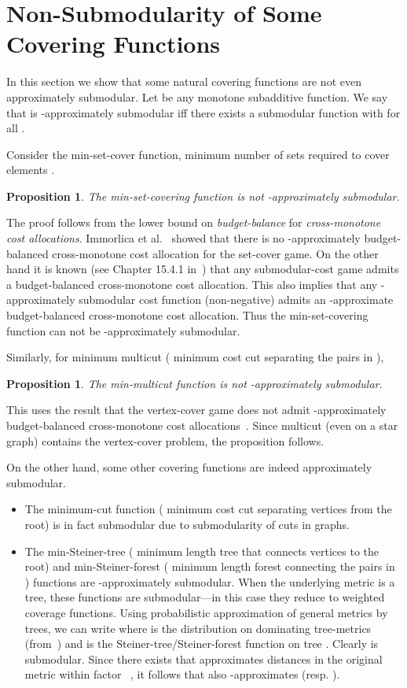 \documentclass[11pt,letterpaper]{article}
\newtheorem{proposition}[theorem]{Proposition}
\newenvironment{proof}{

\noindent{\bf Proof:}} {\hfill


}
\begin{document}
\section{Non-Submodularity of Some Covering Functions}
\label{sec:lbd} In this section we show that some natural covering functions are not even approximately submodular. Let
 be any monotone subadditive function. We say that  is -approximately
submodular iff there exists a submodular function  with  for all .


Consider the min-set-cover function,  minimum number of sets required to cover elements .
\begin{proposition}
The min-set-covering function is not -approximately submodular.
\end{proposition}
\begin{proof}
The proof follows from the lower bound on {\em budget-balance} for {\em cross-monotone cost allocations}. Immorlica et
al.~\cite{IMM08} showed that there is no -approximately budget-balanced cross-monotone cost allocation for the
set-cover game. On the other hand it is known (see Chapter 15.4.1 in~\cite{AlgGameThy-book}) that any submodular-cost
game admits a budget-balanced cross-monotone cost allocation. This also implies that any -approximately
submodular cost function (non-negative) admits an -approximate budget-balanced cross-monotone cost allocation.
Thus the min-set-covering function can not be -approximately submodular.
\end{proof}

Similarly, for minimum multicut ( minimum cost cut separating the pairs in ),
\begin{proposition}
The min-multicut function is not -approximately submodular.
\end{proposition}
\begin{proof}
This uses the result that the vertex-cover game does not admit -approximately budget-balanced
cross-monotone cost allocations~\cite{IMM08}. Since multicut (even on a star graph) contains the vertex-cover problem,
the proposition follows.
\end{proof}

On the other hand, some other covering functions are indeed approximately submodular.
\begin{itemize}
\item The minimum-cut function ( minimum cost cut separating vertices  from the root) is in fact submodular due to
submodularity of cuts in graphs.
\item The min-Steiner-tree ( minimum length tree that connects vertices
 to the root) and min-Steiner-forest ( minimum length forest connecting the pairs in ) functions are
-approximately submodular. When the underlying metric is a tree, these functions are submodular---in this
case they reduce to weighted coverage functions. Using probabilistic approximation of general metrics by trees, we can
write  where  is the distribution on dominating tree-metrics
(from~\cite{FRT03}) and  is the Steiner-tree/Steiner-forest function on tree . Clearly  is submodular. Since
there exists  that approximates distances in the original metric within factor ~\cite{FRT03},
it follows that  also -approximates  (resp. ).
\end{itemize}
\end{document}
